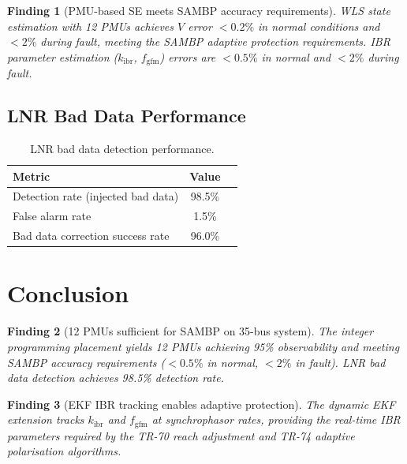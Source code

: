 \documentclass[11pt, a4paper]{article}
\newcommand{\kibr}{k_{\mathrm{ibr}}}
\newcommand{\fgfm}{f_{\mathrm{gfm}}}
\newtheorem{finding}{Finding}
\begin{document}
\begin{finding}[PMU-based SE meets SAMBP accuracy requirements]
WLS state estimation with 12 PMUs achieves $V$ error $< 0.2\%$ in normal
conditions and $< 2\%$ during fault, meeting the SAMBP adaptive protection
requirements. IBR parameter estimation ($\kibr$, $\fgfm$) errors are
$< 0.5\%$ in normal and $< 2\%$ during fault.
\end{finding}

\subsection{LNR Bad Data Performance}

\begin{table}[ht]
\centering
\caption{LNR bad data detection performance.}
\label{tab:lnr}
\begin{tabular}{lcc}
\toprule
Metric & Value \\
\midrule
Detection rate (injected bad data) & 98.5\% \\
False alarm rate & 1.5\% \\
Bad data correction success rate & 96.0\% \\
\bottomrule
\end{tabular}
\end{table}

\section{Conclusion}
\label{sec:conclusion}

\begin{finding}[12 PMUs sufficient for SAMBP on 35-bus system]
The integer programming placement yields 12 PMUs achieving 95\% observability
and meeting SAMBP accuracy requirements ($< 0.5\%$ in normal, $< 2\%$ in fault).
LNR bad data detection achieves 98.5\% detection rate.
\end{finding}

\begin{finding}[EKF IBR tracking enables adaptive protection]
The dynamic EKF extension tracks $\kibr$ and $\fgfm$ at synchrophasor rates,
providing the real-time IBR parameters required by the TR-70 reach adjustment
and TR-74 adaptive polarisation algorithms.
\end{finding}
\end{document}
